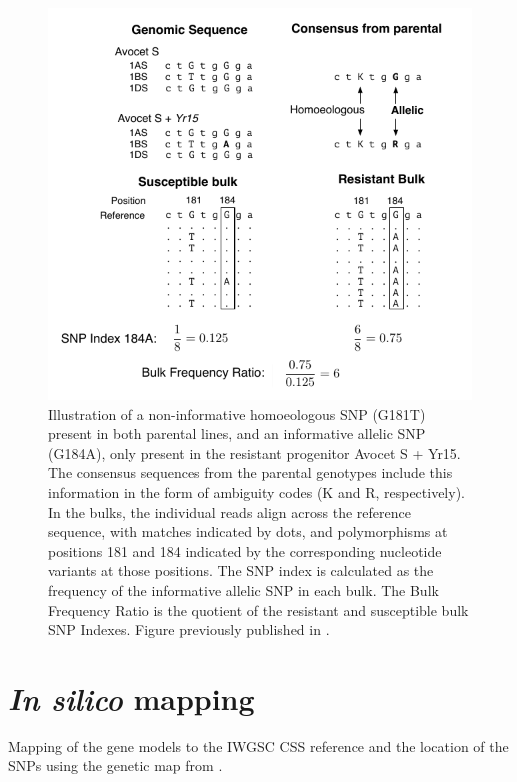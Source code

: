 \begin{figure}
\includegraphics[width=1\textwidth]{Yr15/Figures/bfr.pdf}
\caption{Illustration of a non-informative homoeologous SNP (G181T) present in both parental lines, and an informative allelic SNP (G184A), only present in the resistant progenitor Avocet S + Yr15. The consensus sequences from the parental genotypes include this information in the form of ambiguity codes (K and R, respectively). In the bulks, the individual reads align across the reference sequence, with matches indicated by dots, and polymorphisms at positions 181 and 184 indicated by the corresponding nucleotide variants at those positions. The SNP index is calculated as the frequency of the informative allelic SNP in each bulk. The Bulk Frequency Ratio is the quotient of the resistant and susceptible bulk SNP Indexes. Figure previously published in \citet{Ramirez-Gonzalez2015c}. }
\label{fig:yr15:bfr}
\end{figure}

\section{\textit{In silico} mapping}
Mapping of the gene models to the IWGSC CSS \cite{Mayer2014} reference and the location of the SNPs using the genetic map from \citet{Wang2014}.

